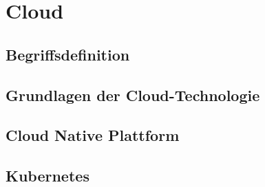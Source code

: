 \newpage
\section{Cloud}
\subsection{Begriffsdefinition}
\subsection{Grundlagen der Cloud-Technologie}
\subsection{Cloud Native Plattform}
\subsection{Kubernetes}